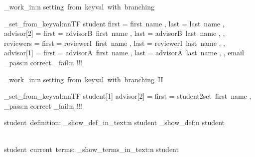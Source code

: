 \documentclass{article}
\begin{document}

\sttests_work_in:n {setting~from~keyval~with~branching}

      \starray_set_from_keyval:nnTF
        {student}
        {
          first = first~name ,
          last = last~name ,
          advisor[2] = {
            first = advisorB~first~name ,
            last  = advisorB~last~name ,
          } ,
          reviewers = {
            first = reviewerI~first~name ,
            last  = reviewerI~last~name ,
          } ,
          advisor[1] = {
            first = advisorA~first~name ,
            last  = advisorA~last~name ,
          } ,
          email
        }
        {\sttests_pass:n {correct}}
        {\sttests_fail:n {!!!}}

\sttests_work_in:n {setting~from~keyval~with~branching~II}

      \starray_set_from_keyval:nnTF
        {student[1]}
        {
          advisor[2] = {
            first = student2set~first~name ,
            }
        }
        {\sttests_pass:n {correct}}
        {\sttests_fail:n {!!!}}

\par
student~definition:
\starray_show_def_in_text:n {student}
\starray_show_def:n {student}

\\[2\baselineskip]
student~current~terms:
\starray_show_terms_in_text:n {student}


\ExplSyntaxOff
\end{document}
